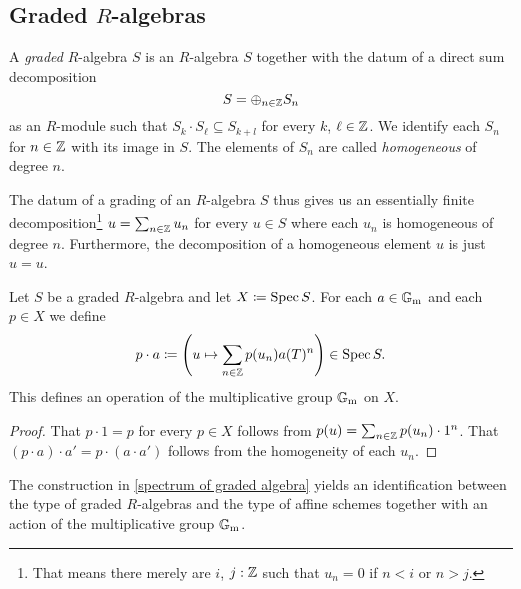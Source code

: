 \subsection{Graded $R$-algebras}

\begin{definition}
  A \emph{graded} $R$-algebra $S$ is an $R$-algebra $S$ together with the datum of a direct sum decomposition
  \begin{equation*}
    S = \oplus_{n \in \mathbb{Z}} S_n
  \end{equation*}
  as an $R$-module such that $S_k \cdot S_\ell \subseteq S_{k + l}$
  for every $k$, $\ell \in \mathbb{Z}$.  We identify each $S_n$ for $n \in \mathbb{Z}$
  with its image in $S$.  The elements of $S_n$ are called \emph{homogeneous} of degree $n$.
\end{definition}

\begin{remark}
  The datum of a grading of an $R$-algebra $S$ thus gives us an
  essentially finite decomposition\footnote{That means there merely
    are $i$, $j :\mathbb{Z}$ such that $u_n = 0$ if $n < i$ or $n > j$.}
  $u = \sum_{n \in \mathbb{Z}} u_n$ for every $u \in S$ where each $u_n$ is
  homogeneous of degree $n$.  Furthermore, the decomposition of a
  homogeneous element $u$ is just $u = u$.
\end{remark}

\begin{proposition}\label{spectrum of graded algebra}
  Let $S$ be a graded $R$-algebra and let $X \coloneqq \operatorname{Spec} S$.  For each $a \in \mathbb{G}_\mathrm{m}$ and each $p \in X$ we define
  \begin{equation*}
    p \cdot a \coloneqq \left(u \mapsto \sum_{n \in \mathbb{Z}} p(u_n) a(T)^n\right) \in \operatorname{Spec} S.
  \end{equation*}
  This defines an operation of the multiplicative group $\mathbb{G}_\mathrm{m}$ on $X$.
\end{proposition}

\begin{proof}
  That $p \cdot 1 = p$ for every $p \in X$ follows from
  $p(u) = \sum_{n \in \mathbb{Z}} p(u_n)\cdot 1^n$.  That
  $(p \cdot a) \cdot a' = p \cdot (a \cdot a')$ follows from the
  homogeneity of each $u_n$.
\end{proof}

\begin{theorem}
  The construction in \cref{spectrum of graded algebra} yields an
  identification between the type of graded $R$-algebras and the type
  of affine schemes together with an action of the multiplicative
  group $\mathbb{G}_\mathrm{m}$.
\end{theorem}

